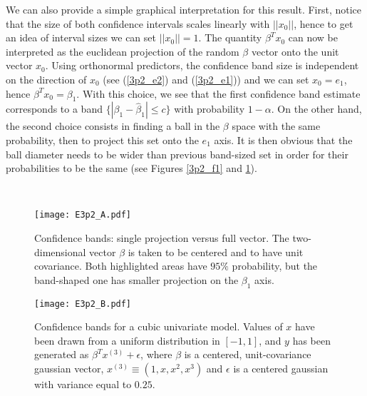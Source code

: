 We can also provide a simple graphical interpretation for this result. First, notice that the size of both confidence
intervals scales linearly with $||x_0||$, hence to get an idea of interval sizes we can set $||x_0|| = 1$.
The quantity $\beta^T x_0$ can now be interpreted as the euclidean projection of the random $\beta$ vector
onto the unit vector $x_0$. Using orthonormal predictors, the confidence band size is independent on the direction
of $x_0$ (see (\ref{3p2_e2}) and (\ref{3p2_e1})) and we can set $x_0 = e_1$, hence $\beta^T x_0 = \beta_1$. With this
choice, we see that the first confidence band estimate corresponds to a band $\{|\beta_1 - \hat{\beta}_1| \leq c \}$ with probability $1 - \alpha$. On the other hand, the second choice consists in finding a ball in the $\beta$ space with the same probability, then to project this set onto the $e_1$ axis. It is then obvious that the ball diameter needs
to be wider than  previous band-sized set in order for their probabilities to be the same (see Figures \ref{3p2_f1} and \ref{3p2_f2}).

\hspace{0.5cm}\\
\begin{figure}
\begin{minipage}{\half}
	\texttt{[image: E3p2\_A.pdf]} \caption{Confidence bands: single projection versus full vector.
		The two-dimensional vector $\beta$ is taken to be centered and to have unit covariance. Both highlighted areas
		have $95\%$ probability, but the band-shaped one has smaller projection on the $\beta_1$ axis. \label{3p2_f1}}

\end{minipage}\halfspace
\begin{minipage}{\half}
\texttt{[image: E3p2\_B.pdf]} \caption{Confidence bands for a cubic univariate model. Values of $x$ have
	been drawn from a uniform distribution in $[-1, 1]$, and $y$ has been generated as $\beta^T x^{(3)} + \epsilon$,
	where $\beta$ is a centered, unit-covariance gaussian vector, $x^{(3)} \equiv (1, x, x^2, x^3)$ and $\epsilon$
	is a centered gaussian with variance equal to $0.25$. \label{3p2_f2}}
\end{minipage}
	\end{figure}

